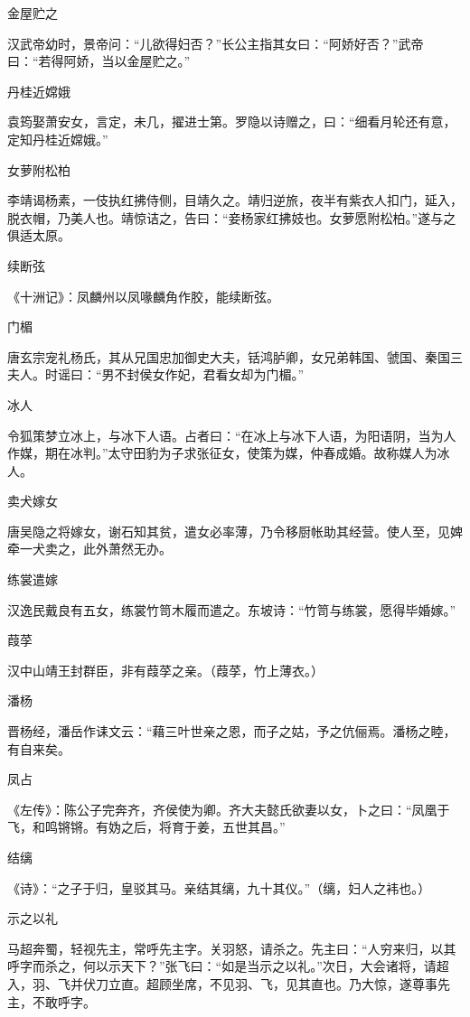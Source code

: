 \documentclass[a4paper,12pt,UTF8,twoside]{ctexbook}
\begin{document}
    金屋贮之
    
    汉武帝幼时，景帝问：“儿欲得妇否？”长公主指其女曰：“阿娇好否？”武帝曰：“若得阿娇，当以金屋贮之。”
    
    丹桂近嫦娥
    
    袁筠娶萧安女，言定，未几，擢进士第。罗隐以诗赠之，曰：“细看月轮还有意，定知丹桂近嫦娥。”
    
    女萝附松柏
    
    李靖谒杨素，一伎执红拂侍侧，目靖久之。靖归逆旅，夜半有紫衣人扣门，延入，脱衣帽，乃美人也。靖惊诘之，告曰：“妾杨家红拂妓也。女萝愿附松柏。”遂与之俱适太原。
    
    续断弦
    
    《十洲记》：凤麟州以凤喙麟角作胶，能续断弦。
    
    门楣
    
    唐玄宗宠礼杨氏，其从兄国忠加御史大夫，铦鸿胪卿，女兄弟韩国、虢国、秦国三夫人。时谣曰：“男不封侯女作妃，君看女却为门楣。”
    
    冰人
    
    令狐策梦立冰上，与冰下人语。占者曰：“在冰上与冰下人语，为阳语阴，当为人作媒，期在冰判。”太守田豹为子求张征女，使策为媒，仲春成婚。故称媒人为冰人。
    
    卖犬嫁女
    
    唐吴隐之将嫁女，谢石知其贫，遣女必率薄，乃令移厨帐助其经营。使人至，见婢牵一犬卖之，此外萧然无办。
    
    练裳遣嫁
    
    汉逸民戴良有五女，练裳竹笥木履而遣之。东坡诗：“竹笥与练裳，愿得毕婚嫁。”
    
    葭莩
    
    汉中山靖王封群臣，非有葭莩之亲。（葭莩，竹上薄衣。）
    
    潘杨
    
    晋杨经，潘岳作诔文云：“藉三叶世亲之恩，而子之姑，予之伉俪焉。潘杨之睦，有自来矣。
    
    凤占
    
    《左传》：陈公子完奔齐，齐侯使为卿。齐大夫懿氏欲妻以女，卜之曰：“凤凰于飞，和鸣锵锵。有妫之后，将育于姜，五世其昌。”
    
    结缡
    
    《诗》：“之子于归，皇驳其马。亲结其缡，九十其仪。”（缡，妇人之袆也。）
    
    示之以礼
    
    马超奔蜀，轻视先主，常呼先主字。关羽怒，请杀之。先主曰：“人穷来归，以其呼字而杀之，何以示天下？”张飞曰：“如是当示之以礼。”次日，大会诸将，请超入，羽、飞并伏刀立直。超顾坐席，不见羽、飞，见其直也。乃大惊，遂尊事先主，不敢呼字。
    
\end{document}
